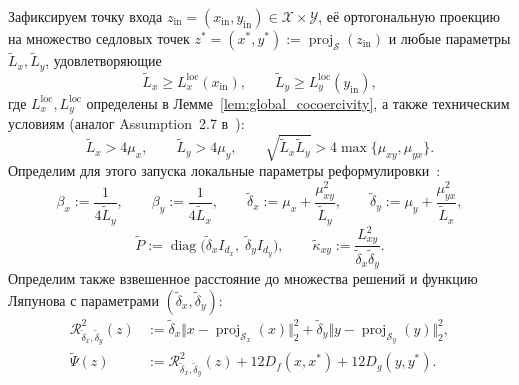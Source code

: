 \documentclass[11pt, a4paper]{article}
\theoremstyle{definition}
\begin{document}
Зафиксируем точку входа $z_{\mathrm{in}} = (x_{\mathrm{in}}, y_{\mathrm{in}}) \in \mathcal{X} \times \mathcal{Y}$, её ортогональную проекцию на множество седловых точек $z^* = (x^*, y^*) := \operatorname{proj}_{\mathcal{S}}(z_{\mathrm{in}})$ и любые параметры $\widetilde{L}_x, \widetilde{L}_y$, удовлетворяющие
\begin{equation}\label{eq:tilde_L_bounds}
\widetilde{L}_x \ge L_x^{\mathrm{loc}}(x_{\mathrm{in}}), \qquad \widetilde{L}_y \ge L_y^{\mathrm{loc}}(y_{\mathrm{in}}),
\end{equation}
где $L_x^{\mathrm{loc}}, L_y^{\mathrm{loc}}$ определены в Лемме~\ref{lem:global_cocoercivity}, а также техническим условиям (аналог Assumption~2.7 в~\cite{Borodich2025}):
\[
\widetilde{L}_x > 4 \mu_x, \qquad \widetilde{L}_y > 4 \mu_y, \qquad \sqrt{\widetilde{L}_x \widetilde{L}_y} > 4 \max\{\mu_{xy}, \mu_{yx}\}.
\]
Определим для этого запуска локальные параметры реформулировки~\cite{Borodich2025}:
\begin{equation}\label{eq:local_reformulation_params}
\beta_x := \frac{1}{4 \widetilde{L}_y}, \qquad \beta_y := \frac{1}{4 \widetilde{L}_x}, \qquad \widetilde{\delta}_x := \mu_x + \frac{\mu_{xy}^2}{\widetilde{L}_y}, \qquad \widetilde{\delta}_y := \mu_y + \frac{\mu_{yx}^2}{\widetilde{L}_x},
\end{equation}
\[
\widetilde{P} := \operatorname{diag}\big(\widetilde{\delta}_x I_{d_x},\; \widetilde{\delta}_y I_{d_y}\big), \qquad \widetilde{\kappa}_{xy} := \frac{L_{xy}^2}{\widetilde{\delta}_x \widetilde{\delta}_y}.
\]
Определим также взвешенное расстояние до множества решений и функцию Ляпунова с параметрами $(\widetilde{\delta}_x, \widetilde{\delta}_y)$:
\begin{align}
\mathcal{R}_{\widetilde{\delta}_x, \widetilde{\delta}_y}^2(z) &:= \widetilde{\delta}_x \Vert x - \operatorname{proj}_{\mathcal{S}_x}(x) \Vert_2^2 + \widetilde{\delta}_y \Vert y - \operatorname{proj}_{\mathcal{S}_y}(y) \Vert_2^2, \label{eq:weighted_dist} \\
\widetilde{\Psi}(z) &:= \mathcal{R}_{\widetilde{\delta}_x, \widetilde{\delta}_y}^2(z) + 12 D_f(x, x^*) + 12 D_g(y, y^*). \label{eq:lyapunov_psi}
\end{align}
\end{document}
